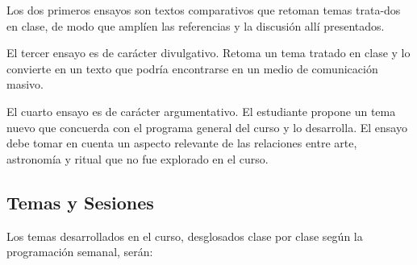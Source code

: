 \documentclass[12pt]{report}
\begin{document}
Los dos primeros ensayos son textos comparativos que retoman temas
trata-dos en clase, de modo que ampl\'ien las referencias y la
discusi\'on all\'i presentados.

El tercer ensayo es de car\'acter divulgativo. Retoma un tema
tratado en clase y lo convierte en un texto que podr\'ia encontrarse
en un medio de comunicaci\'on masivo.  

El cuarto ensayo es de car\'acter argumentativo. El estudiante propone
un tema nuevo que concuerda con el programa general del curso y lo
desarrolla. El ensayo debe tomar en cuenta un aspecto
relevante de las relaciones entre arte, astronom\'ia y ritual que
no fue explorado en el curso. 

\subsection*{Temas y Sesiones}

Los temas desarrollados en el curso, desglosados clase por clase seg\'un
la programaci\'on semanal, ser\'an:
\end{document}
